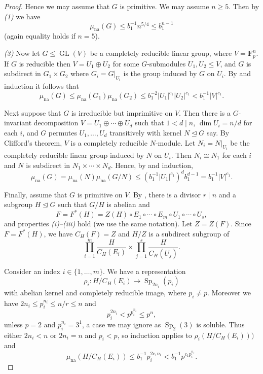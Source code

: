 \documentclass[11pt,reqno]{amsart}
\numberwithin{equation}{section}
\theoremstyle{definition}
\theoremstyle{remark}
\def\F{\mathbf{F}} %
\newcommand\opr[1]{\operatorname{#1}}
\def\GL{\opr{GL}}
\def\Sp{\opr{Sp}}
\def\nsgp{\trianglelefteq}
\def\muna{\mu_{\opr{na}}}
\newcommand\br[1]{{\left(#1\right)}}
\numberwithin{equation}{section}
\begin{document}
\begin{proof}
    Hence we may assume that $G$ is primitive. We may assume $n \ge 5$.
    Then by \emph{(1)} we have
    \[
        \muna(G) \le b_1^{-1} n^{5/4} \le b_1^{n-1}
    \]
    (again equality holds if $n = 5$).

    \emph{(3)} Now let $G \le \GL(V)$ be a completely reducible linear group, where $V = \F_p^n$.
    If $G$ is reducible then $V = U_1 \oplus U_2$ for some $G$-submodules $U_1, U_2 \le V$,
    and $G$ is subdirect in $G_1 \times G_2$ where $G_i = G |_{U_i}$ is the group induced by $G$ on $U_i$.
    By  and induction it follows that
    \[
        \muna(G) \le \muna(G_1) \muna(G_2) \le b_1^{-2} |U_1|^{c_1} |U_2|^{c_1} < b_1^{-1} |V|^{c_1}.
    \]

    Next suppose that $G$ is irreducible but imprimitive on $V$.
    Then there is a $G$-invariant decomposition $V = U_1 \oplus \cdots \oplus U_d$ such that $1 < d \mid n$, $\dim U_i = n / d$ for each $i$, and $G$ permutes $U_1, \dots, U_d$ transitively with kernel $N \nsgp G$ say.
    By Clifford's theorem, $V$ is a completely reducible $N$-module.
    Let $N_i = N|_{U_i}$ be the completely reducible linear group induced by $N$ on $U_i$.
    Then $N_i \cong N_1$ for each $i$ and $N$ is subdirect in $N_1 \times \cdots \times N_d$.
    Hence, by  and induction,
    \[
        \muna(G)
        = \muna(N) \muna(G/N)
        \le \br{b_1^{-1} |U_1|^{c_1}}^{d} b_1^{d-1}
        = b_1^{-1} |V|^{c_1}.
    \]

    Finally, assume that $G$ is primitive on $V$.
    By , there is a divisor $r \mid n$ and a subgroup $H \nsgp G$ such that $G/H$ is abelian and
    \[
        F = F^*(H) = Z(H) \circ E_1 \circ \cdots \circ E_m \circ U_1 \circ \cdots \circ U_s,
    \]
    and properties \emph{(i)--(iii)} hold
    (we use the same notation).
    Let $Z = Z(F)$.
    Since $F = F^*(H)$, we have $C_H(F)=Z$ and $H/Z$ is a subdirect subgroup of
    \begin{equation*}
        \prod_{i=1}^m \frac{H}{C_H(E_i)} \times \prod_{j=1}^s \frac{H}{C_H(U_j)}.
    \end{equation*}

    Consider an index $i \in \{1, \dots, m\}$.
    We have a representation
    \[
        \rho_i : H / C_H(E_i) \to \Sp_{2n_i}(p_i)
    \]
    with abelian kernel and completely reducible image, where $p_i \ne p$.
    Moreover we have $2n_i \le p_i^{n_i} \le n/r \le n$ and
    \[
        p_i^{2n_i} < p^{p_i^{n_i}} \le p^n,
    \]
    unless $p = 2$ and $p_i^{n_i} = 3^1$, a case we may ignore as $\Sp_2(3)$ is soluble.
    Thus either $2n_i < n$ or $2n_i = n$ and $p_i < p$, so induction applies to $\rho_i(H / C_H(E_i)))$ and
    \[
        \muna(H / C_H(E_i))%
        \le b_1^{-1} p_i^{2c_1 n_i}
        < b_1^{-1} p^{c_1 p_i^{n_i}}.
    \]


\end{proof}
\end{document}
